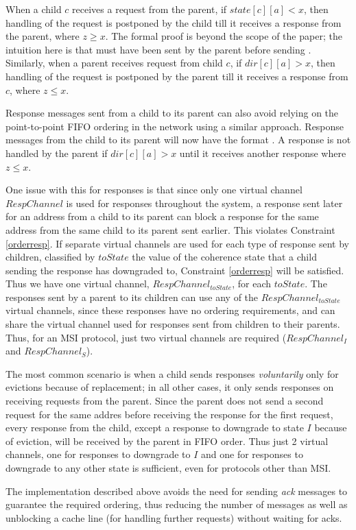 When a child $c$ receives a request  from the parent, if
$state[c][a] < x$, then handling of the request is postponed by the child till
it receives a response  from the parent, where $z \ge x$.
The formal proof is beyond the scope of the paper; the intuition here is that
 must have been sent by the parent before sending
. Similarly, when a parent receives request
 from child $c$, if $dir[c][a] > x$, then handling of the
request is postponed by the parent till it receives a response
 from $c$, where $z \le x$.

Response messages sent from a child to its parent can also avoid relying on the
point-to-point FIFO ordering in the network using a similar approach. Response
messages from the child to its parent will now have the format
. A response  is not
handled by the parent if $dir[c][a] > x$ until it receives another response
 where $z \le x$.

One issue with this for responses is that since only one virtual channel
$RespChannel$ is used for responses throughout the system, a response sent
later for an address from a child to its parent can block a response for the
same address from the same child to its parent sent earlier. This violates
Constraint \ref{orderresp}. If separate virtual channels are used for each type
of response sent by children, classified by $toState$ \ie the value of the
coherence state that a child sending the response has downgraded to, Constraint
\ref{orderresp} will be satisfied. Thus we have one virtual channel,
$RespChannel_{toState}$, for each $toState$. The responses sent by a parent to
its children can use any of the $RespChannel_{toState}$ virtual channels, since
these responses have no ordering requirements, and can share the virtual
channel used for responses sent from children to their parents. Thus, for an
MSI protocol, just two virtual channels are required ($RespChannel_I$ and
$RespChannel_S$).

The most common scenario is when a child sends responses \emph{voluntarily}
only for evictions because of replacement; in all other cases, it only sends
responses on receiving requests from the parent. Since the parent does not send
a second request for the same addres before receiving the response for the
first request, every response from the child, except a response to downgrade to
state $I$ because of eviction, will be received by the parent in FIFO order.
Thus just 2 virtual channels, one for responses to downgrade to $I$ and one for
responses to downgrade to any other state is sufficient, even for protocols
other than MSI.

The implementation described above avoids the need for sending \emph{ack}
messages to guarantee the required ordering, thus reducing the number of
messages as well as unblocking a cache line (for handling further requests)
without waiting for acks.
